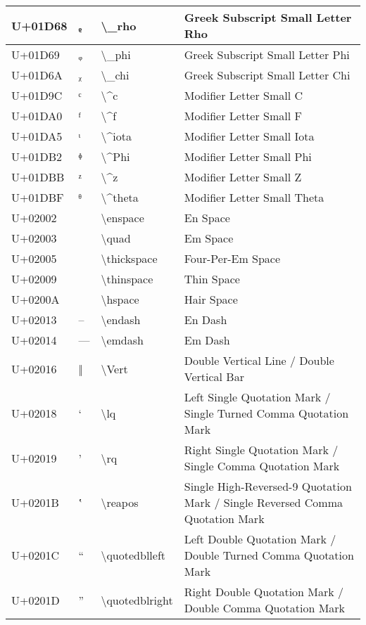 \begin{table}[h]
\begin{tabulary}{\linewidth}{|L|L|L|L|}
\hline
U+01D68 & ᵨ & {\textbackslash}\_rho & Greek Subscript Small Letter Rho \\
\hline
U+01D69 & ᵩ & {\textbackslash}\_phi & Greek Subscript Small Letter Phi \\
\hline
U+01D6A & ᵪ & {\textbackslash}\_chi & Greek Subscript Small Letter Chi \\
\hline
U+01D9C & ᶜ & {\textbackslash}{\textasciicircum}c & Modifier Letter Small C \\
\hline
U+01DA0 & ᶠ & {\textbackslash}{\textasciicircum}f & Modifier Letter Small F \\
\hline
U+01DA5 & ᶥ & {\textbackslash}{\textasciicircum}iota & Modifier Letter Small Iota \\
\hline
U+01DB2 & ᶲ & {\textbackslash}{\textasciicircum}Phi & Modifier Letter Small Phi \\
\hline
U+01DBB & ᶻ & {\textbackslash}{\textasciicircum}z & Modifier Letter Small Z \\
\hline
U+01DBF & ᶿ & {\textbackslash}{\textasciicircum}theta & Modifier Letter Small Theta \\
\hline
U+02002 &   & {\textbackslash}enspace & En Space \\
\hline
U+02003 &   & {\textbackslash}quad & Em Space \\
\hline
U+02005 &   & {\textbackslash}thickspace & Four-Per-Em Space \\
\hline
U+02009 &   & {\textbackslash}thinspace & Thin Space \\
\hline
U+0200A &   & {\textbackslash}hspace & Hair Space \\
\hline
U+02013 & – & {\textbackslash}endash & En Dash \\
\hline
U+02014 & — & {\textbackslash}emdash & Em Dash \\
\hline
U+02016 & ‖ & {\textbackslash}Vert & Double Vertical Line / Double Vertical Bar \\
\hline
U+02018 & ‘ & {\textbackslash}lq & Left Single Quotation Mark / Single Turned Comma Quotation Mark \\
\hline
U+02019 & ’ & {\textbackslash}rq & Right Single Quotation Mark / Single Comma Quotation Mark \\
\hline
U+0201B & ‛ & {\textbackslash}reapos & Single High-Reversed-9 Quotation Mark / Single Reversed Comma Quotation Mark \\
\hline
U+0201C & “ & {\textbackslash}quotedblleft & Left Double Quotation Mark / Double Turned Comma Quotation Mark \\
\hline
U+0201D & ” & {\textbackslash}quotedblright & Right Double Quotation Mark / Double Comma Quotation Mark \\

\end{tabulary}
\end{table}
